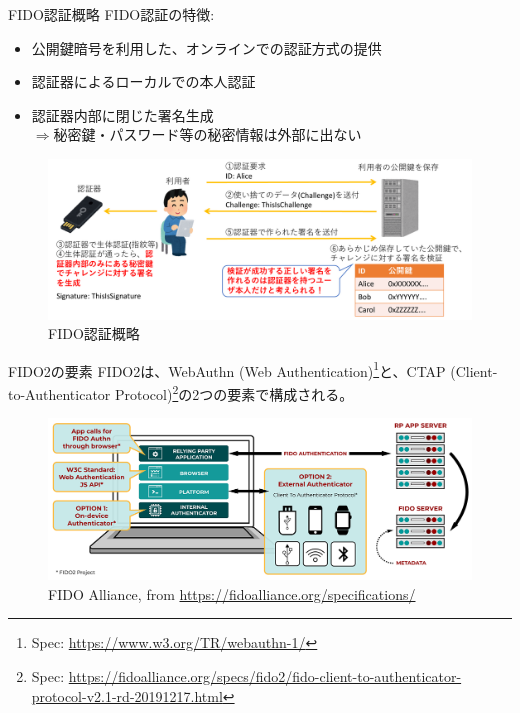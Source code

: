 \documentclass[12pt,dvipdfmx,uplatex]{beamer}
\begin{document}
\begin{frame}{FIDO認証概略}
FIDO認証の特徴:
\begin{itemize}
 \item 公開鍵暗号を利用した、オンラインでの認証方式の提供
 \item 認証器によるローカルでの本人認証
 \item 認証器内部に閉じた署名生成\\ $\Rightarrow$\alert{秘密鍵・パスワード等の秘密情報は外部に出ない}
\end{itemize}
\begin{figure}
\begin{center}
\includegraphics[width=0.9\linewidth]{Figs/FIDO2-auth.pdf}
\caption{FIDO認証概略}
\end{center}
\end{figure}
\end{frame}

\begin{frame}{FIDO2の要素}
FIDO2は、\alert{WebAuthn (Web Authentication)\footnote[frame]{\tiny Spec: \url{https://www.w3.org/TR/webauthn-1/}}と、CTAP (Client-to-Authenticator Protocol)\footnote[frame]{\tiny Spec: \url{https://fidoalliance.org/specs/fido2/fido-client-to-authenticator-protocol-v2.1-rd-20191217.html}}の2つの要素で構成}される。

\begin{figure}
\begin{center}
\includegraphics[width=0.9\linewidth]{Figs/FIDO2-Graphic-v2.png}
\caption{\footnotesize \textcopyright FIDO Alliance, from \url{https://fidoalliance.org/specifications/}}
\end{center}
\end{figure}
\end{frame}
\end{document}
